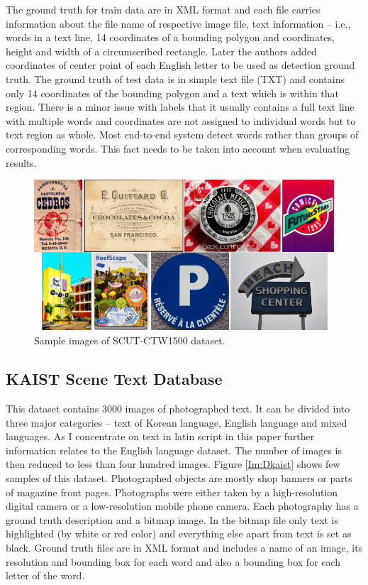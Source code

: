 The ground truth for train data are in XML format and each file carries information about the file name of respective image file, text information -- i.e., words in a text line, 14 coordinates of a bounding polygon and coordinates, height and width of a circumscribed rectangle. Later the authors added coordinates of center point of each English letter to be used as detection ground truth. The ground truth of test data is in simple text file (TXT) and contains only 14 coordinates of the bounding polygon and a text which is within that region. There is a minor issue with labels that it usually contains a full text line with multiple words and coordinates are not assigned to individual words but to text region as whole. Most end-to-end system detect words rather than groups of corresponding words. This fact needs to be taken into account when evaluating results.

\begin{figure}[hbtp]
    \centering
    \includegraphics[width=\textwidth]{obrazky/Dataset_ctw.png}
    \caption{Sample images of SCUT-CTW1500 dataset.}
    \label{Im:Dctw}
\end{figure}

\subsection{KAIST Scene Text Database}

This dataset contains 3000 images of photographed text. It can be divided into three major categories -- text of Korean language, English language and mixed languages. As I concentrate on text in latin script in this paper further information relates to the English language dataset. The number of images is then reduced to less than four hundred images. Figure \ref*{Im:Dkaist} shows few samples of this dataset. Photographed objects are mostly shop banners or parts of magazine front pages. Photographs were either taken by a high-resolution digital camera or a low-resolution mobile phone camera.\cite{kaist} Each photography has a ground truth description and a bitmap image. In the bitmap file only text is highlighted (by white or red color) and everything else apart from text is set as black. Ground truth files are in XML format and includes a name of an image, its resolution and bounding box for each word and also a bounding box for each letter of the word.

